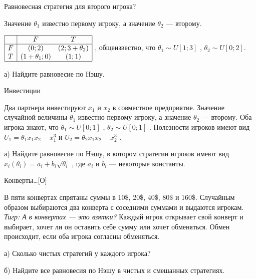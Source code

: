 \begin{problem}
 Равновесная стратегия для второго игрока?

Значение  $\theta _{1} $  известно первому игроку, а значение  $\theta _{2} $  — второму.

 $\begin{array}{|c|cc|}  \hline {} & {F} & {T} \\  \hline {F} & {\left(0;2\right)} & {\left(2;3+\theta _{2} \right)} \\ {T} & {\left(1+\theta _{1} ;0\right)} & {\left(1;1\right)} \\  \hline  \end{array}$ , общеизвестно, что  $\theta _{1} \sim U\left[1;3\right]$ ,  $\theta _{2} \sim U\left[0;2\right]$.

а)	Найдите равновесие по Нэшу.



\begin{sol}

\end{sol}
\end{problem}



\begin{problem}
 Инвестиции\par
Два партнера инвестируют  $x_{1} $  и  $x_{2} $  в совместное предприятие. Значение случайной величины   $\theta _{1} $  известно первому игроку, а значение  $\theta _{2} $  — второму. Оба игрока знают, что  $\theta _{1} \sim U\left[0;1\right]$ ,  $\theta _{2} \sim U\left[0;1\right]$ .
Полезности игроков имеют вид  $U_{1} =\theta _{1} x_{1} x_{2} -x_{1}^{3} $  и  $U_{2} =\theta _{2} x_{1} x_{2} -x_{2}^{3} $ .\par
а)	Найдите равновесие по Нэшу, в котором стратегии игроков имеют вид  $x_{i} \left(\theta _{i} \right)=a_{i} +b_{i} \sqrt{\theta _{i} } $ , где  $a_{i} $  и  $b_{i} $  — некоторые константы. \par




\begin{sol}

\end{sol}
\end{problem}



\begin{problem}
 Конверты\ldots $[$О$]$\par
В пяти конвертах спрятаны суммы в 10\$, 20\$, 40\$, 80\$ и 160\$. Случайным образом выбираются два конверта с соседними суммами и выдаются игрокам. {\it Тигр: А в конвертах — это взятки?} Каждый игрок открывает свой конверт и выбирает, хочет ли он оставить себе сумму или хочет обменяться. Обмен происходит, если оба игрока согласны обменяться.\par
а)	Сколько чистых стратегий у каждого игрока?\par
б)	Найдите все равновесия по Нэшу в чистых и смешанных стратегиях.



\begin{sol}

\end{sol}
\end{problem}


